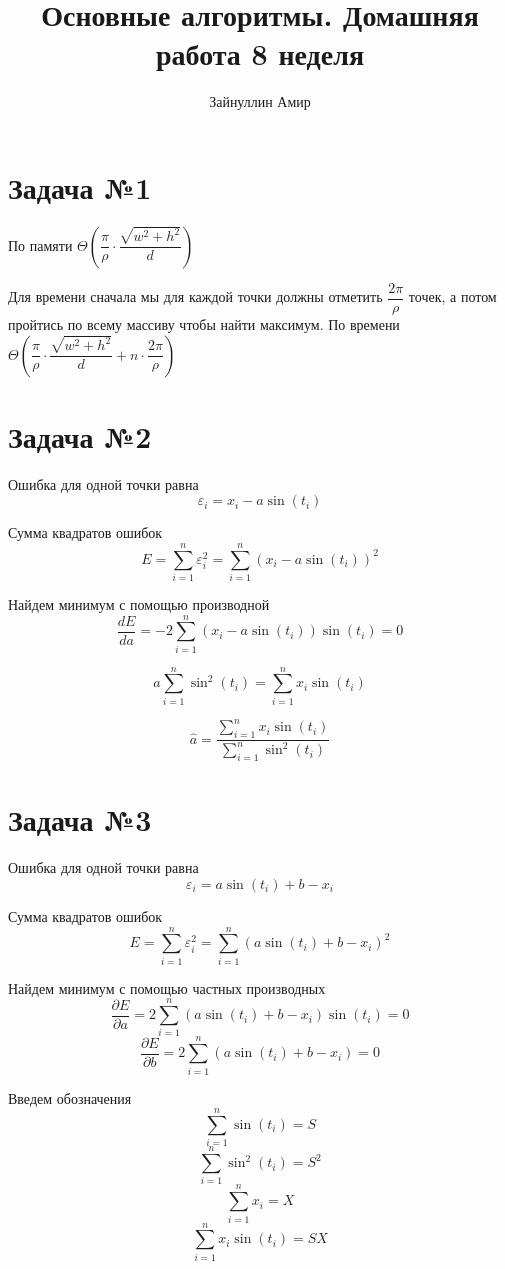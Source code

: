\documentclass{article}
\begin{document}
\title{\textbf{Основные алгоритмы. Домашняя работа 8 неделя}}


\author{Зайнуллин Амир}
\maketitle

\section*{Задача №1}
По памяти $\Theta \left(\dfrac{\pi}{\rho} \cdot \dfrac{\sqrt{w^2 + h^2}}{d}\right)$

Для времени сначала мы для каждой точки должны отметить $\dfrac{2 \pi}{\rho}$ точек, а потом пройтись по всему массиву чтобы найти максимум. 
По времени $\Theta \left(\dfrac{\pi}{\rho} \cdot \dfrac{\sqrt{w^2 + h^2}}{d} + n \cdot \dfrac{2\pi}{\rho}\right)$
\section*{Задача №2}

Ошибка для одной точки равна 
$$ \varepsilon_i = x_i - a \sin(t_i) $$

Сумма квадратов ошибок
$$ E = \sum_{i = 1}^{n} \varepsilon_i^2 = \sum_{i = 1}^{n}(x_i - a \sin(t_i))^2 $$

Найдем минимум с помощью производной 
$$\frac{dE}{da} = -2 \sum_{i = 1}^{n} (x_i - a \sin(t_i)) \sin(t_i) = 0 $$

$$a\sum_{i=1}^{n}\sin^2(t_i) = \sum_{i=1}^{n}x_i\sin(t_i)$$

$$\hat{a} = \frac{\sum_{i=1}^{n}x_i\sin(t_i)}{\sum_{i=1}^{n}\sin^2(t_i)} $$

\section*{Задача №3} 

Ошибка для одной точки равна 
$$ \varepsilon_i = a \sin(t_i) + b - x_i $$

Сумма квадратов ошибок
$$ E = \sum_{i = 1}^{n} \varepsilon_i^2 = \sum_{i = 1}^{n}(a \sin(t_i) + b - x_i)^2 $$

Найдем минимум с помощью частных производных 
$$\frac{\partial E}{\partial a} = 2 \sum_{i = 1}^{n} (a \sin(t_i) + b - x_i) \sin(t_i) = 0 $$
$$\frac{\partial E}{\partial b} = 2 \sum_{i = 1}^{n} (a \sin(t_i) + b - x_i) = 0 $$

Введем обозначения 
$$ \sum_{i = 1}^{n} \sin(t_i) = S $$
$$ \sum_{i = 1}^{n} \sin^2(t_i) = S^2 $$
$$ \sum_{i = 1}^{n} x_i = X $$
$$ \sum_{i = 1}^{n} x_i \sin(t_i) = SX $$
\end{document}

